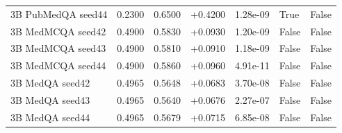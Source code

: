 \begin{table}[t]
\begin{tabular}{lllllll}
3B PubMedQA seed44 & 0.2300 & 0.6500 & +0.4200 & 1.28e-09 & True & False \\
3B MedMCQA seed42 & 0.4900 & 0.5830 & +0.0930 & 1.20e-09 & False & False \\
3B MedMCQA seed43 & 0.4900 & 0.5810 & +0.0910 & 1.18e-09 & False & False \\
3B MedMCQA seed44 & 0.4900 & 0.5860 & +0.0960 & 4.91e-11 & False & False \\
3B MedQA seed42 & 0.4965 & 0.5648 & +0.0683 & 3.70e-08 & False & False \\
3B MedQA seed43 & 0.4965 & 0.5640 & +0.0676 & 2.27e-07 & False & False \\
3B MedQA seed44 & 0.4965 & 0.5679 & +0.0715 & 6.85e-08 & False & False \\
\hline
\end{tabular}
\end{table}
